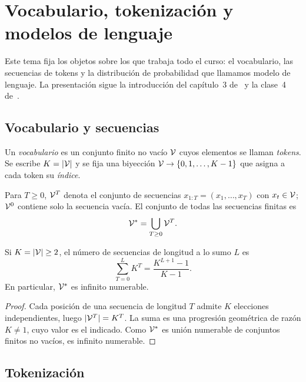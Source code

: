 \chapter{Vocabulario, tokenización y modelos de lenguaje}
\label{tema:1}

Este tema fija los objetos sobre los que trabaja todo el curso: el vocabulario, las secuencias de tokens y la distribución de probabilidad que llamamos modelo de lenguaje. La presentación sigue la introducción del capítulo~3 de~\cite{jm3} y la clase~4 de~\cite{cs224n}.

\section{Vocabulario y secuencias}

\begin{definicion}[Vocabulario]
Un \emph{vocabulario} es un conjunto finito no vacío $\mathcal{V}$ cuyos elementos se llaman \emph{tokens}. Se escribe $K=\lvert\mathcal{V}\rvert$ y se fija una biyección $\mathcal{V}\to\{0,1,\dots,K-1\}$ que asigna a cada token su \emph{índice}.
\end{definicion}

\begin{definicion}[Secuencias]
Para $T\ge 0$, $\mathcal{V}^{T}$ denota el conjunto de secuencias $x_{1:T}=(x_1,\dots,x_T)$ con $x_t\in\mathcal{V}$; $\mathcal{V}^{0}$ contiene solo la secuencia vacía. El conjunto de todas las secuencias finitas es
\[
\mathcal{V}^{*}=\bigcup_{T\ge 0}\mathcal{V}^{T}.
\]
\end{definicion}

\begin{proposicion}\label{prop:contar-secuencias}
Si $K=\lvert\mathcal{V}\rvert\ge 2$, el número de secuencias de longitud a lo sumo $L$ es
\[
\sum_{T=0}^{L} K^{T}=\frac{K^{L+1}-1}{K-1}.
\]
En particular, $\mathcal{V}^{*}$ es infinito numerable.
\end{proposicion}

\begin{proof}
Cada posición de una secuencia de longitud $T$ admite $K$ elecciones independientes, luego $\lvert\mathcal{V}^{T}\rvert=K^{T}$. La suma es una progresión geométrica de razón $K\neq 1$, cuyo valor es el indicado. Como $\mathcal{V}^{*}$ es unión numerable de conjuntos finitos no vacíos, es infinito numerable.
\end{proof}

\section{Tokenización}

